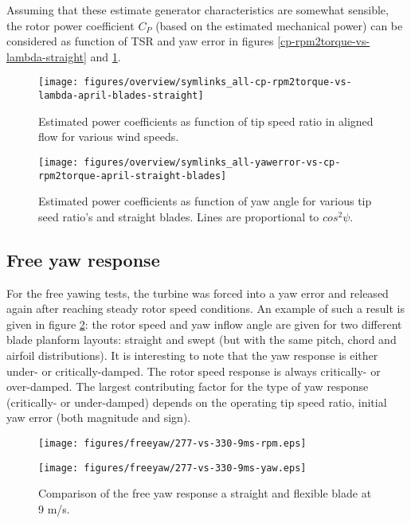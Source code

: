 \documentclass[a4paper]{jpconf}
\begin{document}
Assuming that these estimate generator characteristics are somewhat sensible, the rotor power coefficient $C_P$ (based on the estimated mechanical power) can be considered as function of TSR and yaw error in figures \ref{cp-rpm2torque-vs-lambda-straight} and \ref{cp-rpm2torque-vs-yawerror-straight}.


\begin{figure}[h]
\begin{minipage}{17pc}
\texttt{[image: figures/overview/symlinks\_all-cp-rpm2torque-vs-lambda-april-blades-straight]}
\caption{\label{cp-rpm2torque-vs-lambda-straight} Estimated power coefficients as function of tip speed ratio in aligned flow for various wind speeds.}
\vspace{10px}
\end{minipage}\hspace{3pc}%
\begin{minipage}{17pc}
\texttt{[image: figures/overview/symlinks\_all-yawerror-vs-cp-rpm2torque-april-straight-blades]}
\caption{\label{cp-rpm2torque-vs-yawerror-straight} Estimated power coefficients as function of yaw angle for various tip seed ratio's and straight blades. Lines are proportional to $cos^2 \psi$.}
\end{minipage} 
\end{figure}

\clearpage
\subsection{Free yaw response}

For the free yawing tests, the turbine was forced into a yaw error and released again after reaching steady rotor speed conditions. An example of such a result is given in figure \ref{freeyaw-flex-vs-samo}: the rotor speed and yaw inflow angle are given for two different blade planform layouts: straight and swept (but with the same pitch, chord and airfoil distributions). It is interesting to note that the yaw response is either under- or critically-damped. The rotor speed response is always critically- or over-damped. The largest contributing factor for the type of yaw response (critically- or under-damped) depends on the operating tip speed ratio, initial yaw error (both magnitude and sign).

\begin{figure}[h]
\centering
\begin{minipage}{\textwidth}
\centering
\texttt{[image: figures/freeyaw/277-vs-330-9ms-rpm.eps]}
\end{minipage}
\begin{minipage}{\textwidth}
\centering
\texttt{[image: figures/freeyaw/277-vs-330-9ms-yaw.eps]}
\caption{\label{freeyaw-flex-vs-samo} Comparison of the free yaw response a straight and flexible blade at 9 m/s.}
\end{minipage} 
\end{figure}
\end{document}
